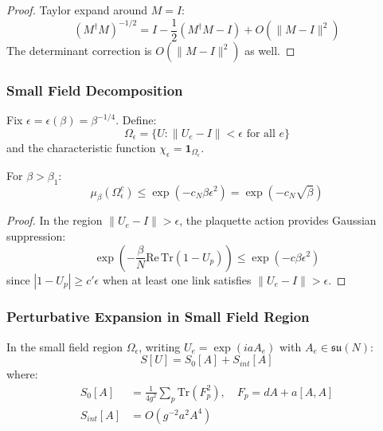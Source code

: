\begin{proof}
Taylor expand around $M = I$:
\begin{equation}
(M^\dagger M)^{-1/2} = I - \frac{1}{2}(M^\dagger M - I) + O(\|M-I\|^2)
\end{equation}
The determinant correction is $O(\|M-I\|^2)$ as well.
\end{proof}

\subsubsection{Small Field Decomposition}

\begin{definition}
Fix $\epsilon = \epsilon(\beta) = \beta^{-1/4}$. Define:
\begin{equation}
\Omega_\epsilon = \{U : \|U_e - I\| < \epsilon \text{ for all } e\}
\end{equation}
and the characteristic function $\chi_\epsilon = \mathbf{1}_{\Omega_\epsilon}$.
\end{definition}

\begin{lemma}
\label{lem:large_field_suppression}
For $\beta > \beta_1$:
\begin{equation}
\mu_\beta(\Omega_\epsilon^c) \leq \exp\left(-c_N \beta \epsilon^2\right) = \exp(-c_N \sqrt{\beta})
\end{equation}
\end{lemma}

\begin{proof}
In the region $\|U_e - I\| > \epsilon$, the plaquette action provides Gaussian suppression:
\begin{equation}
\exp\left(-\frac{\beta}{N} \mathrm{Re}\,\mathrm{Tr}(1 - U_p)\right) \leq \exp\left(-c \beta \epsilon^2\right)
\end{equation}
since $|1 - U_p| \geq c' \epsilon$ when at least one link satisfies $\|U_e - I\| > \epsilon$.
\end{proof}

\subsubsection{Perturbative Expansion in Small Field Region}

\begin{lemma}
In the small field region $\Omega_\epsilon$, writing $U_e = \exp(ia A_e)$ with $A_e \in \mathfrak{su}(N)$:
\begin{equation}
S[U] = S_0[A] + S_{int}[A]
\end{equation}
where:
\begin{align}
S_0[A] &= \frac{1}{4g^2} \sum_p \mathrm{Tr}(F_p^2), \quad F_p = dA + a [A, A] \\
S_{int}[A] &= O(g^{-2} a^2 A^4)
\end{align}
\end{lemma}


